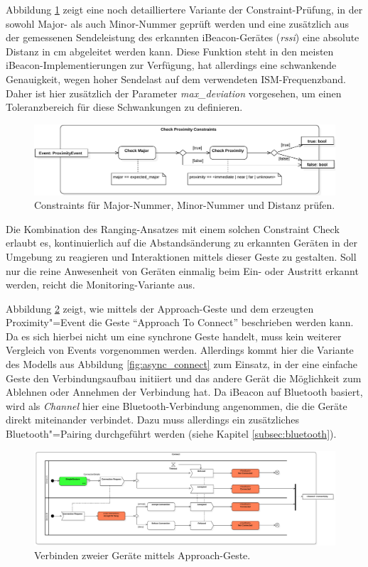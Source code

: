 Abbildung \ref{fig:approach_check_distance} zeigt eine noch detailliertere Variante der Constraint-Prüfung, in der sowohl Major- als auch Minor-Nummer geprüft werden und eine zusätzlich aus der gemessenen Sendeleistung des erkannten iBeacon-Gerätes (\textit{rssi}) eine absolute Distanz in cm abgeleitet werden kann. Diese Funktion steht in den meisten iBeacon-Implementierungen zur Verfügung, hat allerdings eine schwankende Genauigkeit, \zb wegen hoher Sendelast auf dem verwendeten ISM-Frequenzband. Daher ist hier zusätzlich der Parameter \textit{max\_deviation} vorgesehen, um einen Toleranzbereich für diese Schwankungen zu definieren.
\begin{figure}[h]
\centering
\includegraphics[page=2,width=1\textwidth]{bilder/approach/check_constraints}
\caption{Constraints für Major-Nummer, Minor-Nummer und Distanz prüfen.}
\label{fig:approach_check_distance}
\end{figure}

Die Kombination des Ranging-Ansatzes mit einem solchen Constraint Check erlaubt es, kontinuierlich auf die Abstandsänderung zu erkannten Geräten in der Umgebung zu reagieren und Interaktionen mittels dieser Geste zu gestalten. Soll nur die reine Anwesenheit von Geräten einmalig beim Ein- oder Austritt erkannt werden, reicht die Monitoring-Variante aus.

Abbildung \ref{fig:approach_connect} zeigt, wie mittels der Approach-Geste und dem erzeugten Proximity"=Event die Geste "`Approach To Connect"' beschrieben werden kann. Da es sich hierbei nicht um eine synchrone Geste handelt, muss kein weiterer Vergleich von Events vorgenommen werden. Allerdings kommt hier die Variante des Modells aus Abbildung \ref{fig:async_connect} zum Einsatz, in der eine einfache Geste den Verbindungsaufbau initiiert und das andere Gerät die Möglichkeit zum Ablehnen oder Annehmen der Verbindung hat. Da iBeacon auf Bluetooth basiert, wird als \textit{Channel} hier eine Bluetooth-Verbindung angenommen, die die Geräte direkt miteinander verbindet. Dazu muss allerdings ein zusätzliches Bluetooth"=Pairing durchgeführt werden (siehe Kapitel \ref{subsec:bluetooth}).
\begin{figure}
\centering
\includegraphics[width=\textwidth]{bilder/connect}
\caption{Verbinden zweier Geräte mittels Approach-Geste.}
\label{fig:approach_connect}
\end{figure}

